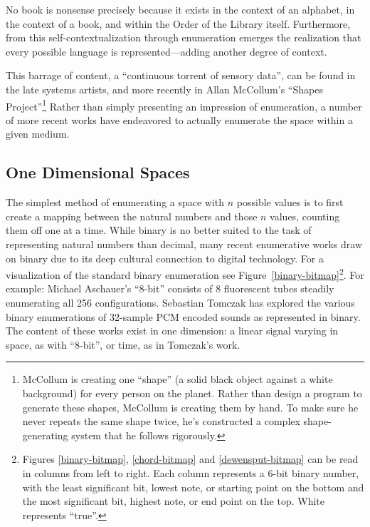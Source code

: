 \documentclass{thesis}
\begin{document}
No book is nonsense precisely because it exists in the context of an alphabet, in the context of a book, and within the Order of the Library itself. Furthermore, from this self-contextualization through enumeration emerges the realization that every possible language is represented---adding another degree of context.
	
This barrage of content, a ``continuous torrent of sensory data'', can be found in the late systems artists\cite{Wright09}, and more recently in Allan McCollum's ``Shapes Project''\cite{allan_mccollum_shapes_2006}\footnote{McCollum is creating one ``shape'' (a solid black object against a white background) for every person on the planet. Rather than design a program to generate these shapes, McCollum is creating them by hand. To make sure he never repeats the same shape twice, he's constructed a complex shape-generating system that he follows rigorously.} Rather than simply presenting an impression of enumeration, a number of more recent works have endeavored to actually enumerate the space within a given medium.

\subsection{One Dimensional Spaces}

The simplest method of enumerating a space with $n$ possible values is to first create a mapping between the natural numbers and those $n$ values, counting them off one at a time. While binary is no better suited to the task of representing natural numbers than decimal, many recent enumerative works draw on binary due to its deep cultural connection to digital technology. For a visualization of the standard binary enumeration see Figure~\ref{binary-bitmap}\footnote{Figures \ref{binary-bitmap}, \ref{chord-bitmap} and \ref{dewensput-bitmap} can be read in columns from left to right. Each column represents a 6-bit binary number, with the least significant bit, lowest note, or starting point on the bottom and the most significant bit, highest note, or end point on the top. White represents ``true''.}. For example: Michael Aschauer's ``8-bit''\cite{michael_aschauer_8-bit_????} consists of 8 fluorescent tubes steadily enumerating all 256 configurations. Sebastian Tomczak\cite{tomczak_hardware-based_2009}\cite{tomczak_all_2009} has explored the various binary enumerations of 32-sample PCM encoded sounds as represented in binary. The content of these works exist in one dimension: a linear signal varying in space, as with ``8-bit'', or time, as in Tomczak's work.
\end{document}

